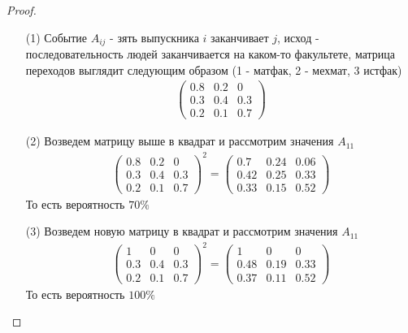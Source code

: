     \begin{proof}
        \begin{itemize}
        \item[(1)] Событие $A_{ij}$ - зять выпускника $i$ заканчивает $j$, исход - последовательность людей заканчивается на каком-то факультете, матрица переходов выглядит следующим образом (1 - матфак, 2 - мехмат, 3 истфак)
            \begin{gather*}
            \begin{pmatrix}
                0.8 & 0.2 & 0\\
                0.3 & 0.4 & 0.3\\
                0.2 & 0.1 & 0.7
            \end{pmatrix}
            \end{gather*}
        \item[(2)] Возведем матрицу выше в квадрат и рассмотрим значения $A_{11}$
            \begin{gather*}
            \begin{pmatrix}
                0.8 & 0.2 & 0\\
                0.3 & 0.4 & 0.3\\
                0.2 & 0.1 & 0.7
            \end{pmatrix}^2
            =
            \begin{pmatrix}
                0.7 & 0.24 & 0.06\\
                0.42 & 0.25 & 0.33\\
                0.33 & 0.15 & 0.52
            \end{pmatrix}
            \end{gather*}
            То есть вероятность $70 \%$
        \item[(3)] Возведем новую матрицу в квадрат и рассмотрим значения $A_{11}$
            \begin{gather*}
            \begin{pmatrix}
                1 & 0 & 0\\
                0.3 & 0.4 & 0.3\\
                0.2 & 0.1 & 0.7
            \end{pmatrix}^2
            =
            \begin{pmatrix}
                1 & 0 & 0\\
                0.48 & 0.19 & 0.33\\
                0.37 & 0.11 & 0.52
            \end{pmatrix}
            \end{gather*}
            То есть вероятность $100 \%$
        \end{itemize}
    \end{proof}